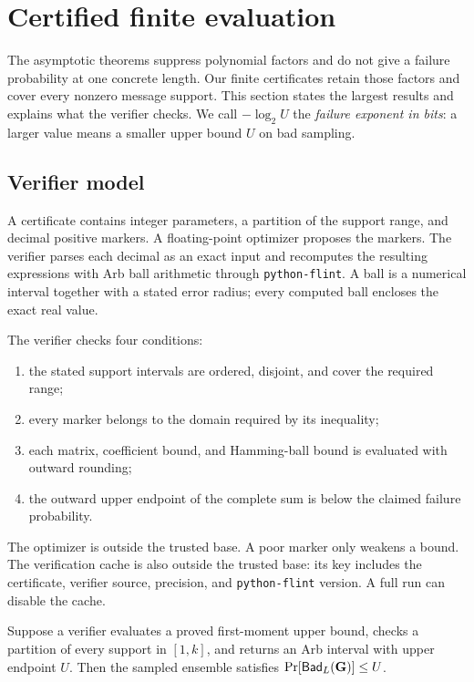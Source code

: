 \section{Certified finite evaluation}
\label{sec:certificates}

The asymptotic theorems suppress polynomial factors and do not give a failure
probability at one concrete length.  Our finite certificates retain those
factors and cover every nonzero message support.  This section states the
largest results and explains what the verifier checks.
We call $-\log_2 U$ the \emph{failure exponent in bits}: a larger value means
a smaller upper bound $U$ on bad sampling.

\subsection{Verifier model}

A certificate contains integer parameters, a partition of the support range,
and decimal positive markers.  A floating-point optimizer proposes the
markers.  The verifier parses each decimal as an exact input and recomputes
the resulting expressions with Arb ball arithmetic through
\texttt{python-flint}.  A ball is a numerical interval together with a stated
error radius; every computed ball encloses the exact real value.

The verifier checks four conditions:

\begin{enumerate}
  \item the stated support intervals are ordered, disjoint, and cover the
  required range;
  \item every marker belongs to the domain required by its inequality;
  \item each matrix, coefficient bound, and Hamming-ball bound is evaluated
  with outward rounding;
  \item the outward upper endpoint of the complete sum is below the claimed
  failure probability.
\end{enumerate}

The optimizer is outside the trusted base.  A poor marker only weakens a
bound.  The verification cache is also outside the trusted base: its key
includes the certificate, verifier source, precision, and
\texttt{python-flint} version.  A full run can disable the cache.

\begin{proposition}
\label{prop:certificate-soundness}
Suppose a verifier evaluates a proved first-moment upper bound, checks a
partition of every support in $[1,k]$, and returns an Arb interval with upper
endpoint $U$.  Then the sampled ensemble satisfies
$\Pr[\mathsf{Bad}_L(\mathbf G)]\leq U$.
\end{proposition}

